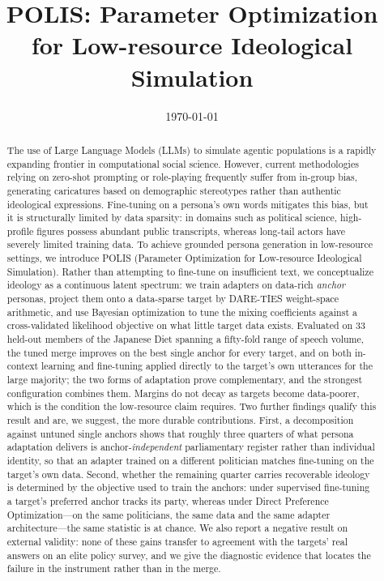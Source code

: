 \documentclass[11pt,letterpaper]{article}
\title{POLIS: Parameter Optimization for Low-resource Ideological Simulation}
\author{}
\date{\today}
\begin{document}
\maketitle

\begin{abstract}
    The use of Large Language Models (LLMs) to simulate agentic populations is a rapidly expanding frontier in computational social science. However, current methodologies relying on zero-shot prompting or role-playing frequently suffer from in-group bias, generating caricatures based on demographic stereotypes rather than authentic ideological expressions. Fine-tuning on a persona's own words mitigates this bias, but it is structurally limited by data sparsity: in domains such as political science, high-profile figures possess abundant public transcripts, whereas long-tail actors have severely limited training data. To achieve grounded persona generation in low-resource settings, we introduce POLIS (Parameter Optimization for Low-resource Ideological Simulation). Rather than attempting to fine-tune on insufficient text, we conceptualize ideology as a continuous latent spectrum: we train adapters on data-rich \emph{anchor} personas, project them onto a data-sparse target by DARE-TIES weight-space arithmetic, and use Bayesian optimization to tune the mixing coefficients against a cross-validated likelihood objective on what little target data exists. Evaluated on 33 held-out members of the Japanese Diet spanning a fifty-fold range of speech volume, the tuned merge improves on the best single anchor for every target, and on both in-context learning and fine-tuning applied directly to the target's own utterances for the large majority; the two forms of adaptation prove complementary, and the strongest configuration combines them. Margins do not decay as targets become data-poorer, which is the condition the low-resource claim requires. Two further findings qualify this result and are, we suggest, the more durable contributions. First, a decomposition against untuned single anchors shows that roughly three quarters of what persona adaptation delivers is anchor-\emph{independent} parliamentary register rather than individual identity, so that an adapter trained on a different politician matches fine-tuning on the target's own data. Second, whether the remaining quarter carries recoverable ideology is determined by the objective used to train the anchors: under supervised fine-tuning a target's preferred anchor tracks its party, whereas under Direct Preference Optimization---on the same politicians, the same data and the same adapter architecture---the same statistic is at chance. We also report a negative result on external validity: none of these gains transfer to agreement with the targets' real answers on an elite policy survey, and we give the diagnostic evidence that locates the failure in the instrument rather than in the merge.
\end{abstract}
\end{document}
